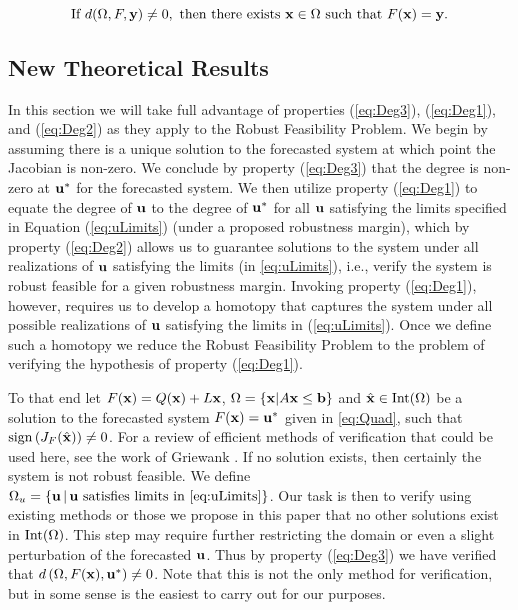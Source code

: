 \begin{equation}\label{eq:Deg2}
  \text{If } d(\Omega,F,\mathbf{y}) \neq 0, \text{ then there exists } \mathbf{x} \in \Omega \text{ such that } F(\mathbf{x})=\mathbf{y}. 
\end{equation}

\subsection{New Theoretical Results}
In this section we will take full advantage of properties (\ref{eq:Deg3}), (\ref{eq:Deg1}), and (\ref{eq:Deg2}) as they apply to the Robust Feasibility Problem.
We begin by assuming there is a unique solution to the forecasted system at which point the Jacobian is non-zero.
We conclude by property (\ref{eq:Deg3}) that the degree is non-zero at $\mathbf{u}^*$ for the forecasted system. 
We then utilize property (\ref{eq:Deg1}) to equate the degree of $\mathbf{u}$ to the degree of $\mathbf{u}^*$ for all $\mathbf{u}$ satisfying the limits specified in Equation (\ref{eq:uLimits}) (under a proposed robustness margin), which by property (\ref{eq:Deg2}) allows us to guarantee solutions to the system under all realizations of $\mathbf{u}$ satisfying the limits (in \ref{eq:uLimits}), i.e., verify the system is robust feasible for a given robustness margin.
Invoking property (\ref{eq:Deg1}), however, requires us to develop a homotopy that captures the system under all possible realizations of $\mathbf{u}$ satisfying the limits in (\ref{eq:uLimits}).
Once we define such a homotopy we reduce the Robust Feasibility Problem to the problem of verifying the hypothesis of property (\ref{eq:Deg1}). 

\medskip
To that end let $F(\mathbf{x})=Q(\mathbf{x})+L\mathbf{x}$, $\Omega=\{\mathbf{x}| A\mathbf{x} \leq \mathbf{b}\}$ and $\hat{\mathbf{x}}\in \operatorname{Int}(\Omega)$ be a solution to the forecasted system $F(\mathbf{x})=\mathbf{u}^*$ given in \cref{eq:Quad}, such that $\operatorname{sign}\left(J_{F}(\hat{\mathbf{x}})\right) \neq 0$.
For a review of efficient methods of verification that could be used here, see the work of Griewank \cite{GRIEWANK2014}. 
If no solution exists, then certainly the system is not robust feasible.
We define $\Omega_u=\{\vu \,|\,\vu \text{ satisfies limits in \cref{eq:uLimits}}\}$.
Our task is then to verify using existing methods or those we propose in this paper that no other solutions exist in $\operatorname{Int}(\Omega)$.
This step may require further restricting the domain or even a slight perturbation of the forecasted $\mathbf{u}$. 
Thus by property (\ref{eq:Deg3}) we have verified that $d\left(\Omega, F(\mathbf{x}), \mathbf{u}^*\right)\neq 0$. 
Note that this is not the only method for verification, but in some sense is the easiest to carry out for our purposes. 

